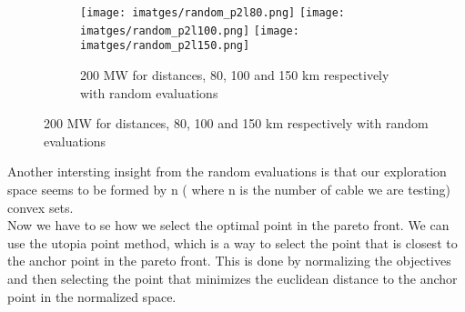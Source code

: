 \documentclass{article}
\begin{document}
\begin{figure}[h]
  \begin{subfigure}{\linewidth}
  \texttt{[image: imatges/random\_p2l80.png]}\hfill
  \texttt{[image: imatges/random\_p2l100.png]}\hfill
  \texttt{[image: imatges/random\_p2l150.png]}
  \caption{200 MW for distances, 80, 100 and 150 km respectively with random evaluations}
  \end{subfigure}\par\medskip
  
\end{figure}
Another intersting insight from the random evaluations is that our exploration space seems to
be formed by n ( where n is the number of cable we are testing) convex sets.\\
Now we have to se how we select the optimal point in the pareto front. We can use the utopia point method,
which is a way to select the point that is closest to the anchor point in the pareto front. This is done
by normalizing the objectives and then selecting the point that minimizes the euclidean distance to the anchor point
in the normalized space.\\
  
\end{document}
